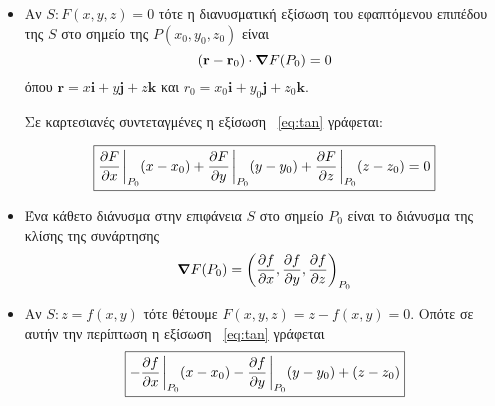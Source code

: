 




\everymath{\displaystyle}




\begin{center}
\end{center}

\vspace{\baselineskip}

\begin{itemize}
	\item Αν $S: F(x,y,z)=0$ τότε η διανυσματική εξίσωση του εφαπτόμενου επιπέδου της $S$ στο σημείο
		της $ P(x_{0}, y_{0}, z_{0}) $ είναι
		\begin{equation}\label{eq:tan}
			(\mathbf{r} - \mathbf{r}_{0})\cdot \grad F(P_{0})=0 
		\end{equation} 
		όπου $ \mathbf{r}=x \mathbf{i}+y \mathbf{j}+z \mathbf{k} $ και $ r_{0}=x_{0} \mathbf{i}+ y
	_{0} \mathbf{j}+ z_{0} \mathbf{k} $.

	Σε καρτεσιανές συντεταγμένες η εξίσωση ~\eqref{eq:tan} γράφεται:

	\[
		\boxed{		
			\pdv{F}{x}\eval_{P_{0}} (x-x_{0}) + \pdv{F}{y}\eval_{P_{0}} (y-y_{0}) +
			\pdv{F}{z}\eval_{P_{0}} (z-z_{0}) =0 
		}
	\]
\item Ένα κάθετο διάνυσμα στην επιφάνεια $ S $ στο σημείο $ P_{0} $ είναι το διάνυσμα της κλίσης της
	συνάρτησης 
	\[
		\grad F{(P_{0})} = \left(\pdv{f}{x}, \pdv{f}{y}, \pdv{f}{z}\right)_{P_{0}}
	\] 

\item Αν $ S: z=f(x,y) $ τότε θέτουμε $ F(x,y,z) = z - f(x,y) = 0 $. Οπότε σε
	αυτήν την περίπτωση η εξίσωση ~\eqref{eq:tan} γράφεται
	\[
		\boxed{
			-\pdv{f}{x}\eval_{P_{0}} (x - x_{0}) - \pdv{f}{y}\eval_{P_{0}} (y - y_{0}) + (z - z_{0})
		}
	\] 
\end{itemize}



